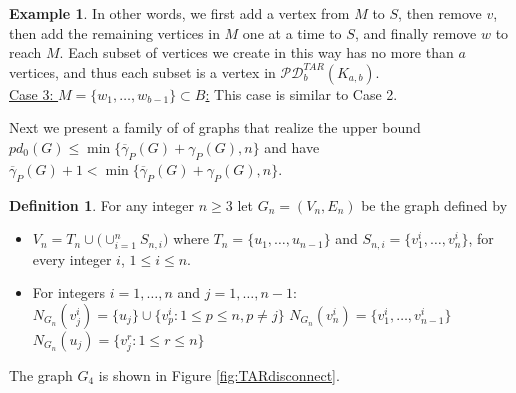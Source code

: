 \documentclass{article}
\numberwithin{figure}{section}   %
\theoremstyle{definition}
\theoremstyle{definition}
\newtheorem{defn}[thm]{Definition}
\theoremstyle{definition}
\newtheorem{ex}[thm]{Example}
\newcommand{\ol}{\overline}
\newcommand{\pd}{\gamma_P}
\newcommand{\pdbar}{\ol\pd}
\newcommand{\tar}{\mathscr{PD}^{TAR}}
\newcommand{\pdo}{pd_0}
\newcommand{\lh}[1]{{\textcolor{red}{[}\textcolor{red}{{LH: \em #1}]}}}
\begin{document}
\begin{ex}
 In other words, we first add a vertex from $M$ to $S$, then remove $v$, then add the remaining vertices in $M$ one at a time to $S$, and finally remove $w$ to reach $M$.  Each subset of vertices we create in this way has no more than $a$ vertices, and thus each subset is a vertex in $\tar_b (K_{a,b})$. \\[1mm]
   \underline{Case 3:  $M = \{w_1, \ldots, w_{b-1}\} \subset B$:} This case is similar to Case 2. %
\end{ex}



Next we present a family of of graphs that realize the upper bound $\pdo(G)\le\min\{\pdbar(G)+\pd(G), n\}$ and have $\pdbar(G)+1<\min\{\pdbar(G)+\pd(G), n\}$.

\begin{defn}\label{e:bigupper}
For any integer $n\geq 3$ let $G_n=(V_n,E_n)$ be the graph defined by
\begin{itemize}
\item $V_n=T_n\cup \big( \cup_{i=1}^n S_{n,i}\big)$ where $T_n=\{u_1,\ldots, u_{n-1}\}$ and $S_{n,i}=\{v^i_1,\ldots , v^i_n\}$, for every integer $i$,  $1\leq i\leq n$.
\item For integers $i=1,\ldots, n$ and $j=1,\ldots , n-1$: \hskip 0.5cm $N_{G_n}(v^i_j)=\{u_j\}\cup \{v^i_p: 1\leq p\leq n, p\not=j\}$
\subitem \hskip 6.9cm $N_{G_n}(v^i_n)=\{v^i_1,\ldots , v^i_{n-1}\}$
\subitem \hskip 6.9cm $N_{G_n}(u_j)=\{v^r_j: 1\leq r\leq n\}$
\end{itemize}
\end{defn}

The graph $G_4$ is shown in Figure \ref{fig:TARdisconnect}.
\end{document}
